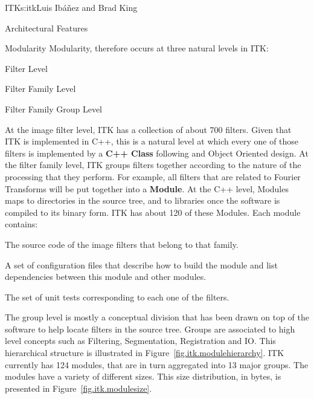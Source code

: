 \begin{aosachapter}{ITK}{s:itk}{Luis Ib\'{a}\~{n}ez and Brad King}
\begin{aosasect1}{Architectural Features}
\begin{aosasect2}{Modularity}
Modularity, therefore occurs at three natural levels in ITK:

\begin{aosaitemize}
\item Filter Level
\item Filter Family Level
\item Filter Family Group Level
\end{aosaitemize}

At the image filter level, ITK has a collection of about 700 filters. Given
that ITK is implemented in C++, this is a natural level at which every one of
those filters is implemented by a \textbf{C++ Class} following and Object
Oriented design.  At the filter family level, ITK groups filters together
according to the nature of the processing that they perform. For example, all
filters that are related to Fourier Transforms will be put together into a
\textbf{Module}.  At the C++ level, Modules maps to directories in the
source tree, and to libraries once the software is compiled to its
binary form. ITK has about 120 of these Modules. Each module contains:

\begin{aosaenumerate}

\item The source code of the image filters that belong to that family.

\item A set of configuration files that describe how to build the module and
list dependencies between this module and other modules.

\item The set of unit tests corresponding to each one of the filters.

\end{aosaenumerate}


The group level is mostly a conceptual division that has been drawn on top of
the software to help locate filters in the source tree. Groups are associated
to high level concepts such as Filtering, Segmentation, Registration and IO.
This hierarchical structure is illustrated in
Figure~\ref{fig.itk.modulehierarchy}.  ITK currently has 124 modules, that are
in turn aggregated into 13 major groups.  The modules have a variety of
different sizes. This size distribution, in bytes, is presented in
Figure~\ref{fig.itk.modulesize}.


\end{aosasect2}
\end{aosasect1}
\end{aosachapter}
